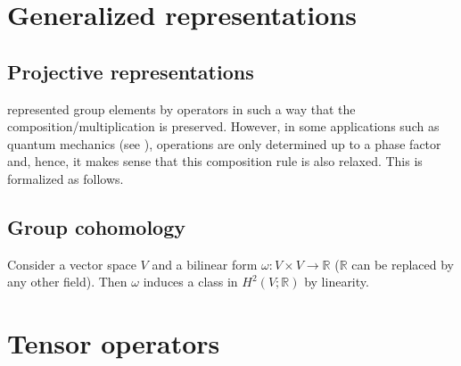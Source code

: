 \section{Generalized representations}
\subsection{Projective representations}\label{section:projective_representation}

     represented group elements by operators in such a way that the composition/multiplication is preserved. However, in some applications such as quantum mechanics (see ), operations are only determined up to a phase factor and, hence, it makes sense that this composition rule is also relaxed. This is formalized as follows.


\subsection{Group cohomology}

    \begin{example}
        Consider a vector space $V$ and a bilinear form $\omega:V\times V\rightarrow\mathbb{R}$ ($\mathbb{R}$ can be replaced by any other field). Then $\omega$ induces a class in $H^2(V;\mathbb{R})$ by linearity.
    \end{example}


\section{Tensor operators}

